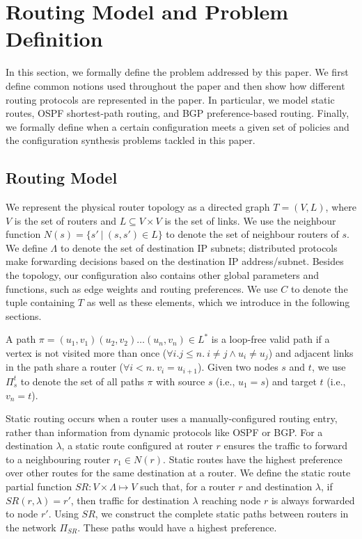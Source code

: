 \section{Routing Model and Problem Definition}

In this section, we formally define the problem addressed by this paper.
We first define common notions used throughout the paper and 
then show how different routing protocols are represented in the paper.
In particular, we model static routes, OSPF shortest-path routing, and BGP preference-based
routing.
Finally, we formally define when a certain configuration meets a given set of policies
and the configuration synthesis problems tackled in this paper.

\subsection{Routing Model}

We represent the physical router topology as a directed graph $T=(V, L)$,
where $V$ is the set of routers and $L\subseteq V\times V$ is the set of links. 
We use the neighbour function $N(s) = \{s'\ | \ (s,s') \in L \}$ to denote 
the set of neighbour routers of $s$. 
We define $\Lambda$ to denote the set of destination IP subnets;
distributed protocols make forwarding decisions based on the 
destination IP address/subnet.
Besides the topology, our configuration also contains other global parameters and functions, such as edge
weights and routing preferences. 
We use $C$ to denote the tuple containing $T$ as well as these elements, which we introduce in the following sections.

A path $\pi = (u_1,v_1) (u_2, v_2) \ldots (u_n, v_n) \in L^*$ is a loop-free valid path if
a  vertex is not visited more than once ($\forall i.j \leq n. 
~i \not= j \wedge u_i \not= u_j$) and adjacent links in the
path share a router ($\forall i < n. ~v_i = u_{i+1}$).
Given two nodes $s$ and $t$, we use $\Pi_s^t$ to denote the set of all paths
$\pi$ with source $s$ (i.e., $u_1=s$) and target $t$ (i.e., $v_n=t$).


Static routing occurs when a router uses a 
manually-configured routing entry, 
rather than information from dynamic protocols like
OSPF or BGP.  
For a destination $\lambda$, a static route configured
at router $r$ ensures the traffic to forward to a 
neighbouring router $r_1 \in N(r)$. 
Static routes have the highest
preference over other routes for the same destination
at a router. We define the static route
partial function $SR: V \times \Lambda \mapsto V$  such
that, for a router $r$ and destination $\lambda$, if $SR(r,\lambda)=r'$, 
then traffic for destination $\lambda$ reaching node $r$ is always
forwarded to node $r'$. 
Using $SR$, we construct the complete
static paths between routers in the network $\Pi_{SR}$. These 
paths would have a highest preference. 

